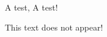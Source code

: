\documentclass[handout]{beamer}
\begin{document}
    \begin{frame}
        A test, A test!
        \note{ }
    \end{frame}    

    \begin{frame}
        This text does not appear!
        \note{ }
    \end{frame}
\end{document}

